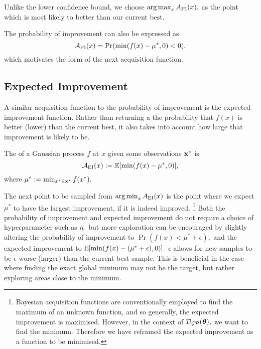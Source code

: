 Unlike the lower confidence bound, we choose $\operatorname*{arg\,max}_{x} A_\mathrm{PI}(x),$ as
the point which is most likely to better than our current best.

The probability of improvement can also be expressed as
$$
    \mathcal{A}_\mathrm{PI}(x) = \Pr(\min(f(x) - \mu^\ast, 0) < 0),
$$
which motivates the form of the next acquisition function.

\subsection*{Expected Improvement}

A similar acquisition function to the probability of improvement is the expected
improvement function. Rather than returning a the probability that $f(x)$ is
better (lower) than the current best, it also takes into account how large that
improvement is likely to be.

\begin{definition}
    The  of a Gaussian process $f$ at $x$ given
    some observations $\mathbf{x}^\ast$ is
    $$
        \mathcal{A}_{\mathrm{EI}}(x)
        := \operatorname{\mathbb{E}}[\min(f(x) - \mu^\ast, 0)],
    $$ where $\mu^\ast := \min_{x^\ast\in\mathbf{x}^\ast}f(x^\ast).$
\end{definition}
The next point to be sampled from $\operatorname*{arg\,min}_{x} A_{\mathrm{EI}}(x)$ is the point
where we expect $\mu^\ast$ to have the largest improvement, if it is indeed
improved.
\footnote{
    Bayesian acquisition functions are
    conventionally employed to find the maximum of an unknown function,
    and so generally, the expected improvement is maximised.
    However, in the context of $\mathcal{D}_{\mathcal{GP}}(\bm{\theta}),$ we want to find the minimum.
    Therefore we have reframed the expected improvement
    as a function to be minimised.
}
Both the probability of improvement and
expected improvement do not require a
choice of hyperparameter such as $\eta,$ but more exploration can be
encouraged by slightly altering the probability of improvement to
$\Pr(f(x) < \mu^\ast + \epsilon),$ and the expected improvement to
$\operatorname{\mathbb{E}}[\min(f(x) - (\mu^\ast + \epsilon), 0)].$ $\epsilon$ allows for
new samples to be $\epsilon$ worse (larger) than the current best sample.
This is beneficial in the case where finding the exact global minimum may not
be the target, but rather exploring areas close to the minimum.



